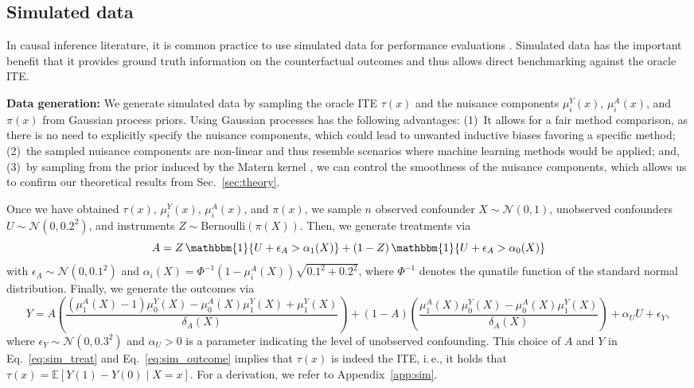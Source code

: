 \documentclass[nonatbib]{article}
\newcommand{\E}{\mathbb{E}}
\newcommand{\ie}{i.\,e.\xspace}
\newcommand{\frameworkname}{MRIV\xspace}
\newcommand{\modelname}{\mbox{MRIV-Net}\xspace}
\theoremstyle{definition}
\theoremstyle{plain}
\begin{document}

\subsection{Simulated data}

In causal inference literature, it is common practice to use simulated data for performance evaluations \cite{Bica.2020, Curth.2021, Hartford.2017}. Simulated data has the important benefit that it provides ground truth information on the counterfactual outcomes and thus allows direct benchmarking against the oracle ITE.

\textbf{Data generation:}
We generate simulated data by sampling the oracle ITE $\tau(x)$ and the nuisance components $\mu_i^Y(x)$, $\mu_i^A(x)$, and $\pi(x)$ from Gaussian process priors. Using Gaussian processes has the following advantages: (1)~It allows for a fair method comparison, as there is no need to explicitly specify the nuisance components, which could lead to unwanted inductive biases favoring a specific method; (2)~the sampled nuisance components are non-linear and thus resemble scenarios where machine learning methods would be applied; and, (3)~by sampling from the prior induced by the Matern kernel \cite{Rasmussen.2008}, we can control the smoothness of the nuisance components, which allows us to confirm our theoretical results from Sec.~\ref{sec:theory}.

Once we have obtained $\tau(x)$, $\mu_i^Y(x)$, $\mu_i^A(x)$, and $\pi(x)$, we sample $n$ observed confounder $X \sim \mathcal{N}(0,1)$, unobserved confounders $U \sim \mathcal{N}\left(0, 0.2^2\right)$, and instruments $Z \sim \mathrm{Bernoulli}(\pi(X))$. Then, we generate treatments via
\begin{equation}\label{eq:sim_treat}
     A = Z \, \mathbbm{1}\{U + \epsilon_{A} > \alpha_1(X)\} + (1-Z) \, \mathbbm{1}\{U + \epsilon_{A} > \alpha_0(X)\}
\end{equation}
with $\epsilon_{A} \sim \mathcal{N}\left(0, 0.1^2\right)$ and $\alpha_i(X) = \Phi^{-1}\left(1 - \mu_i^A(X)\right) \sqrt{0.1^2 + 0.2^2}$, where $\Phi^{-1}$ denotes the qunatile function of the standard normal distribution. Finally, we generate the outcomes via
{\tiny%
\begin{equation}\label{eq:sim_outcome}
     Y = A \left( \frac{(\mu_1^A(X) - 1)\mu_0^Y(X) - \mu_0^A(X)\mu_1^Y(X) + \mu_1^Y(X)}{\delta_A(X)}\right)+ (1-A) \left( \frac{\mu_1^A(X)\mu_0^Y(X) - \mu_0^A(X)\mu_1^Y(X)}{\delta_A(X)} \right) + \alpha_U U +\epsilon_Y,
\end{equation}}
where $\epsilon_Y \sim \mathcal{N}\left(0, 0.3^2\right)$ and $\alpha_U> 0$ is a parameter indicating the level of unobserved confounding. 
This choice of $A$ and $Y$ in Eq.~\eqref{eq:sim_treat} and Eq.~\eqref{eq:sim_outcome} implies that $\tau(x)$ is indeed the ITE, \ie, it holds that $\tau(x) = \E[Y(1) -Y(0) \mid X = x]$. For a derivation, we refer to Appendix~\ref*{app:sim}.
\end{document}
